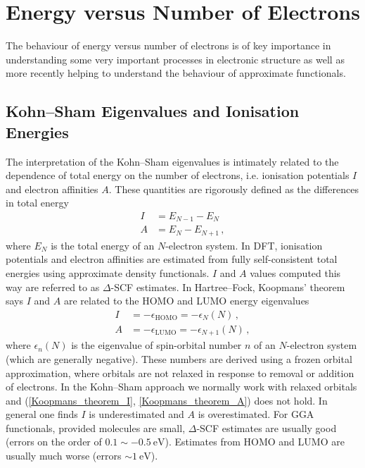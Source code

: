 \documentclass{article}
\theoremstyle{plain}\theoremheaderfont{\normalfont\itshape}\theorembodyfont{\rmfamily}\theoremseparator{.}\newtheorem*{rem}{Remark}\newtheorem*{ex}{Example}\newtheorem*{proof}{Proof}\newtheorem*{altp}{Alternative proof}
\theoremstyle{plain}\theoremheaderfont{\normalfont\bfseries}\theorembodyfont{\rmfamily}\theoremseparator{.}\newtheorem{thm}{Theorem}[section]\newtheorem{lem}[thm]{Lemma}\newtheorem{prop}[thm]{Proposition}\newtheorem*{cor}{Corollary}\newtheorem{defn}[thm]{Definition}\newtheorem{clm}[thm]{Claim}\newtheorem{clminproof}{Claim}
\theoremstyle{break}\theoremheaderfont{\normalfont\itshape}\theorembodyfont{\rmfamily}\theoremseparator{.\medskip}\newtheorem*{proofskip}{Proof}\newtheorem*{exs}{Examples}\newtheorem*{rems}{Remarks}
\theoremstyle{break}\theoremheaderfont{\normalfont\bfseries}\theorembodyfont{\rmfamily}\theoremseparator{.\medskip}\newtheorem{lemskip}[thm]{Lemma}\newtheorem{defnskip}[thm]{Definition}\newtheorem{propskip}[thm]{Proposition}\newtheorem{thmskip}[thm]{Theorem}
\numberwithin{equation}{section}
\newcommand{\unit}[1]{\ \mathrm{#1}}
\begin{document}
    \newpage
    \section{Energy versus Number of Electrons}
    The behaviour of energy versus number of electrons is of key importance in understanding some very important processes in electronic structure as well as more recently helping to understand the behaviour of approximate functionals.
    \subsection{Kohn--Sham Eigenvalues and Ionisation Energies}
    The interpretation of the Kohn--Sham eigenvalues is intimately related to the dependence of total energy on the number of electrons, i.e. ionisation potentials \(I\) and electron affinities \(A\). These quantities are rigorously defined as the differences in total energy
    \begin{align}
        I&=E_{N-1}-E_{N}\\
        A&=E_N-E_{N+1}\,,
    \end{align}
    where \(E_N\) is the total energy of an \(N\)-electron system. In DFT, ionisation potentials and electron affinities are estimated from fully self-consistent total energies using approximate density functionals. \(I\) and \(A\) values computed this way are referred to as \(\Delta\)-SCF estimates. In Hartree--Fock, Koopmans' theorem says \(I\) and \(A\) are related to the HOMO and LUMO energy eigenvalues
    \begin{align}
        I&=-\epsilon_{\text{HOMO}}=-\epsilon_N(N)\,, \label{Koopmans_theorem_I}\\
        A&=-\epsilon_{\text{LUMO}}=-\epsilon_{N+1}(N)\,, \label{Koopmans_theorem_A}
    \end{align}
    where \(\epsilon_n(N)\) is the eigenvalue of spin-orbital number \(n\) of an \(N\)-electron system (which are generally negative). These numbers are derived using a frozen orbital approximation, where orbitals are not relaxed in response to removal or addition of electrons. In the Kohn--Sham approach we normally work with relaxed orbitals and (\ref{Koopmans_theorem_I}, \ref{Koopmans_theorem_A}) does not hold. In general one finds \(I\) is underestimated and \(A\) is overestimated. For GGA functionals, provided molecules are small, \(\Delta\)-SCF estimates are usually good (errors on the order of \(0.1\sim -0.5\unit{eV}\)). Estimates from HOMO and LUMO are usually much worse (errors \(\sim 1\unit{eV}\)).
\end{document}
